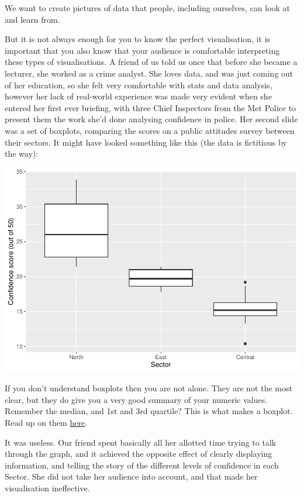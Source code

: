 \documentclass[
]{book}
\begin{document}
We want to create pictures of data that people, including ourselves, can look at and learn from.

But it is not always enough for you to know the perfect visualisation, it is important that you also know that your audience is comfortable interpreting these types of visualisations. A friend of us told us once that before she became a lecturer, she worked as a crime analyst. She loves data, and was just coming out of her education, so she felt very comfortable with stats and data analysis, however her lack of real-world experience was made very evident when she entered her first ever briefing, with three Chief Inspectors from the Met Police to present them the work she'd done analysing confidence in police. Her second slide was a set of boxplots, comparing the scores on a public attitudes survey between their sectors. It might have looked something like this (the data is fictitious by the way):

\includegraphics{bookdown-demo_files/figure-latex/unnamed-chunk-25-1.pdf}

If you don't understand boxplots then you are not alone. They are not the most clear, but they do give you a very good summary of your numeric values. Remember the median, and 1st and 3rd quartile? This is what makes a boxplot. Read up on them \href{https://en.wikipedia.org/wiki/Box_plot}{here}.

It was useless. Our friend spent basically all her allotted time trying to talk through the graph, and it achieved the opposite effect of clearly displaying information, and telling the story of the different levels of confidence in each Sector. She did not take her audience into account, and that made her visualisation ineffective.
\end{document}
